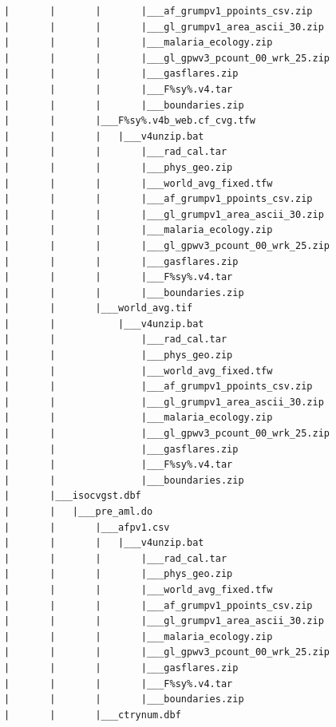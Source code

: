 \documentclass[
]{book}
\begin{document}
\begin{verbatim}
            |       |       |       |___af_grumpv1_ppoints_csv.zip
            |       |       |       |___gl_grumpv1_area_ascii_30.zip
            |       |       |       |___malaria_ecology.zip
            |       |       |       |___gl_gpwv3_pcount_00_wrk_25.zip
            |       |       |       |___gasflares.zip
            |       |       |       |___F%sy%.v4.tar
            |       |       |       |___boundaries.zip
            |       |       |___F%sy%.v4b_web.cf_cvg.tfw
            |       |       |   |___v4unzip.bat
            |       |       |       |___rad_cal.tar
            |       |       |       |___phys_geo.zip
            |       |       |       |___world_avg_fixed.tfw
            |       |       |       |___af_grumpv1_ppoints_csv.zip
            |       |       |       |___gl_grumpv1_area_ascii_30.zip
            |       |       |       |___malaria_ecology.zip
            |       |       |       |___gl_gpwv3_pcount_00_wrk_25.zip
            |       |       |       |___gasflares.zip
            |       |       |       |___F%sy%.v4.tar
            |       |       |       |___boundaries.zip
            |       |       |___world_avg.tif
            |       |           |___v4unzip.bat
            |       |               |___rad_cal.tar
            |       |               |___phys_geo.zip
            |       |               |___world_avg_fixed.tfw
            |       |               |___af_grumpv1_ppoints_csv.zip
            |       |               |___gl_grumpv1_area_ascii_30.zip
            |       |               |___malaria_ecology.zip
            |       |               |___gl_gpwv3_pcount_00_wrk_25.zip
            |       |               |___gasflares.zip
            |       |               |___F%sy%.v4.tar
            |       |               |___boundaries.zip
            |       |___isocvgst.dbf
            |       |   |___pre_aml.do
            |       |       |___afpv1.csv
            |       |       |   |___v4unzip.bat
            |       |       |       |___rad_cal.tar
            |       |       |       |___phys_geo.zip
            |       |       |       |___world_avg_fixed.tfw
            |       |       |       |___af_grumpv1_ppoints_csv.zip
            |       |       |       |___gl_grumpv1_area_ascii_30.zip
            |       |       |       |___malaria_ecology.zip
            |       |       |       |___gl_gpwv3_pcount_00_wrk_25.zip
            |       |       |       |___gasflares.zip
            |       |       |       |___F%sy%.v4.tar
            |       |       |       |___boundaries.zip
            |       |       |___ctrynum.dbf

\end{verbatim}
\end{document}
